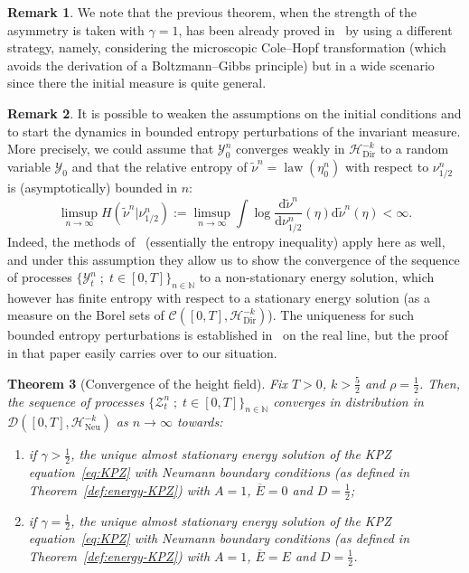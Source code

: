 \documentclass[10pt]{amsart}
\newtheorem{theo}{Theorem}[section]
\theoremstyle{definition}\newtheorem{defi}[theo]{Definition}\newtheorem{rema}[theo]{Remark}\newtheorem{exam}[theo]{Example}\newtheorem{exem}[theo]{Example}\newtheorem{nota}[theo]{Notation}
\DeclareMathOperator{\law}{law}
\newcommand{\bb}[1]{{\mathbb #1}}
\newcommand{\mc}[1]{{\mathcal #1}}
\renewcommand{\mc}[1]{{\mathcal #1}}
\renewcommand{\bar}{\overline}
\renewcommand{\tilde}{\widetilde}
\newcommand*{\dd}{\mathrm{d}}
\begin{document}
\begin{rema}
We note that the previous theorem, when the strength of the asymmetry is taken with $\gamma =1$, has been already proved in~\cite{GLM} by using a different strategy, namely, considering the microscopic Cole--Hopf transformation (which avoids the derivation of a Boltzmann--Gibbs principle) but in a wide scenario since there the initial measure is quite general.
\end{rema}

\begin{rema}\label{rmk:stationary}
It is possible to weaken the assumptions on the initial conditions and to start the dynamics in bounded entropy perturbations of the invariant measure. More precisely, we could assume that $\mc Y^n_0$ converges weakly in $\mc H_{\mathrm{Dir}}^{-k}$ to a random variable $\mc Y_0$ and that the relative entropy of $\tilde \nu^n = \law(\mc \eta^n_0)$ with respect to $\nu^n_{1/2}$ is (asymptotically) bounded in $n$:
\[
\limsup_{n\to\infty} H(\tilde \nu^n | \nu^n_{1/2}) := \limsup_{n\to\infty} \int \log \frac{\dd \tilde \nu^n}{\dd \nu^n_{1/2}}(\eta) \dd\tilde \nu^n(\eta) < \infty.
\]
Indeed, the methods of~\cite{GJS} (essentially the entropy inequality) apply here as well, and under this assumption they allow us to show the convergence of the sequence of processes $\{\mc Y^n_t \; ; \; t \in [0,T]\}_{n\in\bb N}$ to a non-stationary energy solution, which however has finite entropy with respect to a stationary energy solution (as a measure on the Borel sets of $\mc C([0,T], \mc H_{\mathrm{Dir}}^{-k})$). The uniqueness for such bounded entropy perturbations is established in~\cite{Gubinelli2017} on the real line, but the proof in that paper easily carries over to our situation.
\end{rema}

\begin{theo}[Convergence of the height field] \label{theo:convheight}
Fix $T>0$, $k>\frac52$ and $\rho=\frac12$.
%
Then, the sequence of processes $\{\mc Z^n_t\; ;\; t \in [0,T]\}_{n\in{\bb N}}$ converges in distribution in $\mc D([0,T], \mc H_{\mathrm{Neu}}^{-k})$ as $n\to\infty$ towards:
\begin{enumerate}
\item \label{3.20.1} if $\gamma > \frac12$, the unique almost stationary energy solution of the KPZ equation~\eqref{eq:KPZ} with Neumann boundary conditions (as defined in Theorem~\ref{def:energy-KPZ}) with $A=1$, $\bar E=0$ and $D=\frac12$;
\item \label{3.20.2} if $\gamma=\frac12$, the unique almost stationary energy solution of the KPZ equation~\eqref{eq:KPZ} with Neumann boundary conditions (as defined in Theorem~\ref{def:energy-KPZ}) with $A=1$, $\bar E = E$ and $D=\frac12$.
\end{enumerate}
\end{theo}
\end{document}
